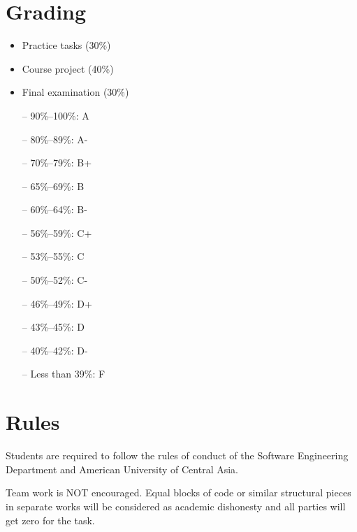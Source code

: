 \documentclass[12pt,a4paper,oneside]{article}
\begin{document}
    \section{Grading}

        \begin{itemize}
            \item Practice tasks (30\%)
            \item Course project (40\%)
            \item Final examination (30\%)
        \end{itemize}

        \begin{itemize} \itemsep-10pt \parskip0pt 
            \item[--] 90\%--100\%: A\\
            \item[--] 80\%--89\%: A-\\
            \item[--] 70\%--79\%: B+\\
            \item[--] 65\%--69\%: B\\
            \item[--] 60\%--64\%: B-\\
            \item[--] 56\%--59\%: C+\\
            \item[--] 53\%--55\%: C\\
            \item[--] 50\%--52\%: C-\\
            \item[--] 46\%--49\%: D+\\
            \item[--] 43\%--45\%: D\\
            \item[--] 40\%--42\%: D-\\
            \item[--] Less than 39\%: F
        \end{itemize}

    \section{Rules}

        Students are required to follow the rules of conduct of the Software
        Engineering Department and American University of Central Asia.

        Team work is NOT encouraged. Equal blocks of code or similar structural
        pieces in separate works will be considered as academic dishonesty and
        all parties will get zero for the task.
\end{document}
